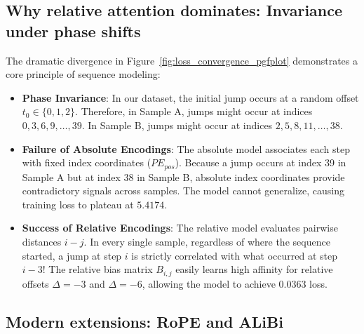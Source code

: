 \documentclass[../labs.tex]{subfiles}
\begin{document}
\subsection{Why relative attention dominates: Invariance under phase shifts}

The dramatic divergence in Figure~\ref{fig:loss_convergence_pgfplot} demonstrates a core principle of sequence modeling:
\begin{itemize}
    \item \textbf{Phase Invariance}: In our dataset, the initial jump occurs at a random offset $t_0 \in \{0, 1, 2\}$. Therefore, in Sample A, jumps might occur at indices $0, 3, 6, 9, \dots, 39$. In Sample B, jumps might occur at indices $2, 5, 8, 11, \dots, 38$.
    \item \textbf{Failure of Absolute Encodings}: The absolute model associates each step with fixed index coordinates ($PE_{pos}$). Because a jump occurs at index 39 in Sample A but at index 38 in Sample B, absolute index coordinates provide contradictory signals across samples. The model cannot generalize, causing training loss to plateau at $5.4174$.
    \item \textbf{Success of Relative Encodings}: The relative model evaluates pairwise distances $i - j$. In every single sample, regardless of where the sequence started, a jump at step $i$ is strictly correlated with what occurred at step $i - 3$! The relative bias matrix $B_{i, j}$ easily learns high affinity for relative offsets $\Delta = -3$ and $\Delta = -6$, allowing the model to achieve $0.0363$ loss.
\end{itemize}

\subsection{Modern extensions: RoPE and ALiBi}
\end{document}
